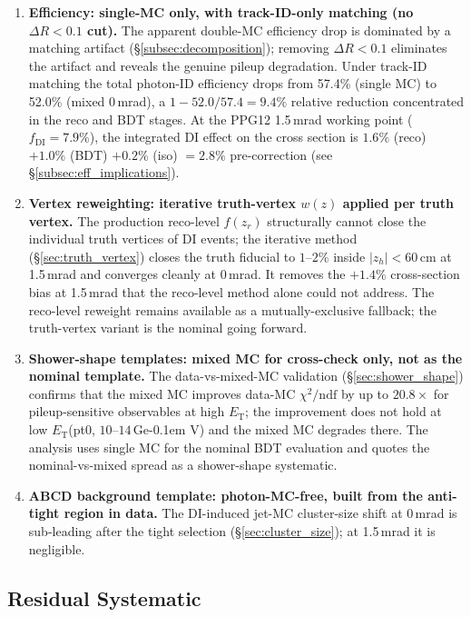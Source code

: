 \documentclass[11pt,a4paper]{article}
\newcommand{\ET}{\ensuremath{E_{\text{T}}}\xspace}
\newcommand{\chidf}{\ensuremath{\chi^2/\mathrm{ndf}}\xspace}
\newcommand{\DR}{\ensuremath{\Delta R}\xspace}
\newcommand{\GeV}{\ifmmode {\mathrm{\ Ge\kern -0.1em V}}\else\textrm{Ge\kern -0.1em V}\fi\xspace}
\begin{document}
\begin{enumerate}
\item \textbf{Efficiency: single-MC only, with track-ID-only
  matching (no $\DR<0.1$ cut).} The apparent double-MC efficiency
  drop is dominated by a matching artifact
  (\S\ref{subsec:decomposition}); removing $\DR<0.1$ eliminates
  the artifact and reveals the genuine pileup degradation. Under
  track-ID matching the total photon-ID efficiency drops from
  57.4\% (single MC) to 52.0\% (mixed 0\,mrad), a
  $1-52.0/57.4 = 9.4\%$ relative reduction concentrated in the
  reco and BDT stages. At the PPG12 1.5\,mrad working point
  ($f_\mathrm{DI}=7.9\%$), the integrated DI effect on the
  cross section is $1.6\%$ (reco) $+ 1.0\%$ (BDT) $+ 0.2\%$ (iso)
  $= 2.8\%$ pre-correction (see \S\ref{subsec:eff_implications}).
\item \textbf{Vertex reweighting: iterative truth-vertex
  $w(z)$ applied per truth vertex.} The production reco-level
  $f(z_r)$ structurally cannot close the individual truth
  vertices of DI events; the iterative method
  (\S\ref{sec:truth_vertex}) closes the truth fiducial to
  $1$--$2\%$ inside $|z_h|<60$\,cm at 1.5\,mrad and converges
  cleanly at 0\,mrad. It removes the $+1.4\%$ cross-section bias
  at 1.5\,mrad that the reco-level method alone could not address.
  The reco-level reweight remains available as a
  mutually-exclusive fallback; the truth-vertex variant is the
  nominal going forward.
\item \textbf{Shower-shape templates: mixed MC for cross-check
  only, not as the nominal template.} The data-vs-mixed-MC
  validation (\S\ref{sec:shower_shape}) confirms that the mixed
  MC improves data-MC \chidf by up to $20.8\times$ for
  pileup-sensitive observables at high \ET; the improvement does
  not hold at low \ET (pt0, $10$--$14$\,\GeV) and the mixed MC
  degrades there. The analysis uses single MC for the nominal BDT
  evaluation and quotes the nominal-vs-mixed spread as a
  shower-shape systematic.
\item \textbf{ABCD background template: photon-MC-free, built
  from the anti-tight region in data.} The DI-induced jet-MC
  cluster-size shift at 0\,mrad is sub-leading after the tight
  selection (\S\ref{sec:cluster_size}); at 1.5\,mrad it is
  negligible.
\end{enumerate}

\subsection{Residual Systematic}
\end{document}
